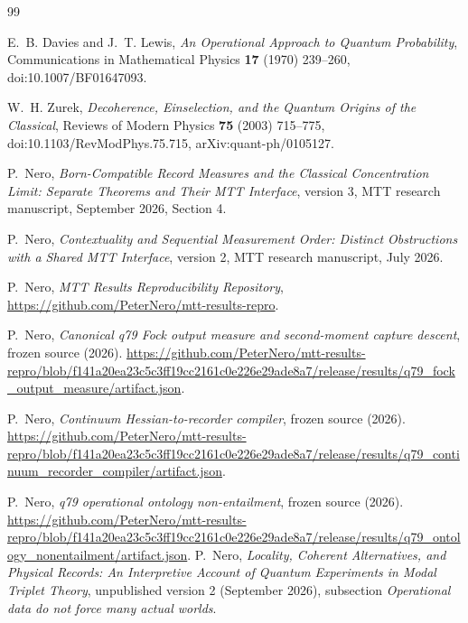 \documentclass[11pt,a4paper]{article}
\theoremstyle{definition}
\theoremstyle{remark}
\begin{document}
\begin{thebibliography}{99}
\raggedright

E.~B. Davies and J.~T. Lewis,
\emph{An Operational Approach to Quantum Probability},
Communications in Mathematical Physics \textbf{17} (1970) 239--260,
doi:10.1007/BF01647093.

W.~H. Zurek,
\emph{Decoherence, Einselection, and the Quantum Origins of the Classical},
Reviews of Modern Physics \textbf{75} (2003) 715--775,
doi:10.1103/RevModPhys.75.715,
arXiv:quant-ph/0105127.

P.~Nero,
\emph{Born-Compatible Record Measures and the Classical Concentration Limit:
Separate Theorems and Their MTT Interface},
version 3, MTT research manuscript, September 2026, Section 4.

P.~Nero,
\emph{Contextuality and Sequential Measurement Order: Distinct Obstructions
with a Shared MTT Interface},
version 2, MTT research manuscript, July 2026.

P.~Nero,
\emph{MTT Results Reproducibility Repository},
\url{https://github.com/PeterNero/mtt-results-repro}.

P.~Nero, \emph{Canonical q79 Fock output measure and second-moment capture descent}, frozen source (2026).
\url{https://github.com/PeterNero/mtt-results-repro/blob/f141a20ea23c5c3ff19cc2161c0e226e29ade8a7/release/results/q79_fock_output_measure/artifact.json}.

P.~Nero, \emph{Continuum Hessian-to-recorder compiler}, frozen source (2026).
\url{https://github.com/PeterNero/mtt-results-repro/blob/f141a20ea23c5c3ff19cc2161c0e226e29ade8a7/release/results/q79_continuum_recorder_compiler/artifact.json}.

P.~Nero, \emph{q79 operational ontology non-entailment}, frozen source (2026).
\url{https://github.com/PeterNero/mtt-results-repro/blob/f141a20ea23c5c3ff19cc2161c0e226e29ade8a7/release/results/q79_ontology_nonentailment/artifact.json}.
P.~Nero, \emph{Locality, Coherent Alternatives, and Physical Records:
An Interpretive Account of Quantum Experiments in Modal Triplet Theory},
unpublished version 2 (September 2026), subsection \emph{Operational data do not
force many actual worlds}.

\end{thebibliography}
\end{document}
